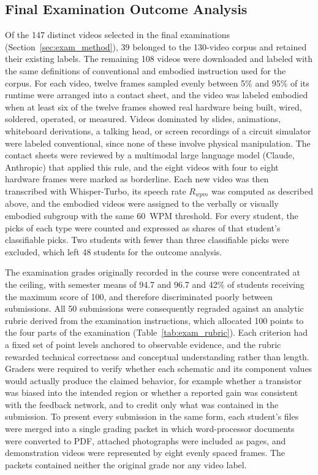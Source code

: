 \documentclass[fleqn,10pt]{JLA_article} %
\begin{document}
\subsection{Final Examination Outcome Analysis}
\label{sec:exam_analysis}

Of the 147 distinct videos selected in the final examinations (Section~\ref{sec:exam_method}), 39 belonged to the 130-video corpus and retained their existing labels. The remaining 108 videos were downloaded and labeled with the same definitions of conventional and embodied instruction used for the corpus. For each video, twelve frames sampled evenly between 5\% and 95\% of its runtime were arranged into a contact sheet, and the video was labeled embodied when at least six of the twelve frames showed real hardware being built, wired, soldered, operated, or measured. Videos dominated by slides, animations, whiteboard derivations, a talking head, or screen recordings of a circuit simulator were labeled conventional, since none of these involve physical manipulation. The contact sheets were reviewed by a multimodal large language model (Claude, Anthropic) that applied this rule, and the eight videos with four to eight hardware frames were marked as borderline. %
Each new video was then transcribed with Whisper-Turbo, its speech rate $R_{wpm}$ was computed as described above, and the embodied videos were assigned to the verbally or visually embodied subgroup with the same 60~WPM threshold. For every student, the picks of each type were counted and expressed as shares of that student's classifiable picks. Two students with fewer than three classifiable picks were excluded, which left 48 students for the outcome analysis.

The examination grades originally recorded in the course were concentrated at the ceiling, with semester means of 94.7 and 96.7 and 42\% of students receiving the maximum score of 100, and therefore discriminated poorly between submissions. All 50 submissions were consequently regraded against an analytic rubric derived from the examination instructions, which allocated 100 points to the four parts of the examination (Table~\ref{tab:exam_rubric}). Each criterion had a fixed set of point levels anchored to observable evidence, and the rubric rewarded technical correctness and conceptual understanding rather than length. Graders were required to verify whether each schematic and its component values would actually produce the claimed behavior, for example whether a transistor was biased into the intended region or whether a reported gain was consistent with the feedback network, and to credit only what was contained in the submission. To present every submission in the same form, each student's files were merged into a single grading packet in which word-processor documents were converted to PDF, attached photographs were included as pages, and demonstration videos were represented by eight evenly spaced frames. The packets contained neither the original grade nor any video label.
\end{document}
